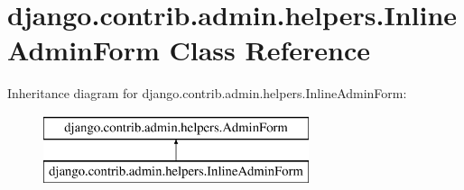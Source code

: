 \hypertarget{classdjango_1_1contrib_1_1admin_1_1helpers_1_1_inline_admin_form}{}\section{django.\+contrib.\+admin.\+helpers.\+Inline\+Admin\+Form Class Reference}
\label{classdjango_1_1contrib_1_1admin_1_1helpers_1_1_inline_admin_form}
Inheritance diagram for django.\+contrib.\+admin.\+helpers.\+Inline\+Admin\+Form\+:\begin{figure}[H]
\begin{center}
\leavevmode
\includegraphics[height=2.000000cm]{classdjango_1_1contrib_1_1admin_1_1helpers_1_1_inline_admin_form}
\end{center}
\end{figure}
